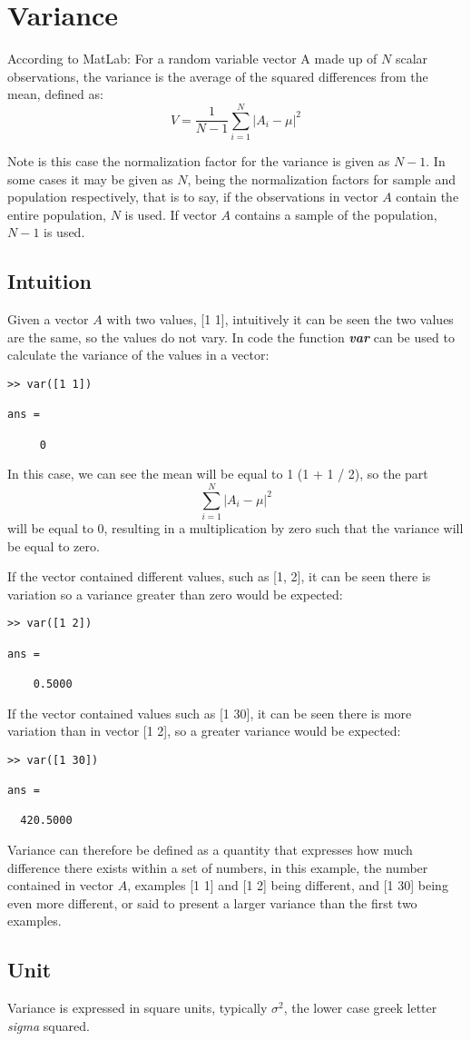 \section{Variance}
According to MatLab:  
For a random variable vector A made up of $N$ scalar observations, the variance is the average of the squared differences from the mean, defined as:
\begin{equation}
V=\frac{1}{N-1}\sum_{i=1}^N|A_i-\mu|^2  \label{variance} 
\end{equation}



Note is this case the normalization factor for the variance is given as $N-1$. In some cases it may be given as $N$, being the normalization factors for sample and population respectively, that is to say, if the observations in vector $A$ contain the entire population, $N$ is used. If vector $A$ contains a sample of the population, $N-1$ is used.
\subsection{Intuition}
Given a vector $A$ with two values, [1 1], intuitively it can be seen the two values are the same, so the values do not vary. In code the function \textbf{\textit{var}} can be used to calculate the variance of the values in a vector:
\begin{verbatim}
>> var([1 1])

ans =

     0
\end{verbatim}
In this case, we can see the mean will be equal to 1 (1 + 1 / 2), so the part
$$
\sum_{i=1}^N|A_i-\mu|^2
$$
will be equal to 0, resulting in a multiplication by zero such that the variance will be equal to zero.

If the vector contained different values, such as [1, 2], it can be seen there is variation so a variance greater than zero would be expected:
\begin{verbatim}
>> var([1 2])

ans =

    0.5000    
\end{verbatim}
If the vector contained values such as [1 30], it can be seen there is more variation than in vector [1 2], so a greater variance would be expected:
\begin{verbatim}
>> var([1 30])

ans =

  420.5000  
\end{verbatim}
Variance can therefore be defined as a quantity that expresses how much difference there exists within a set of numbers, in this example, the number contained in vector $A$, examples [1 1] and [1 2] being different, and [1 30] being even more different, or said to present a larger variance than the first two examples.
\subsection{Unit}
Variance is expressed in square units, typically $\sigma^2$, the lower case greek letter \textit{sigma} squared.





